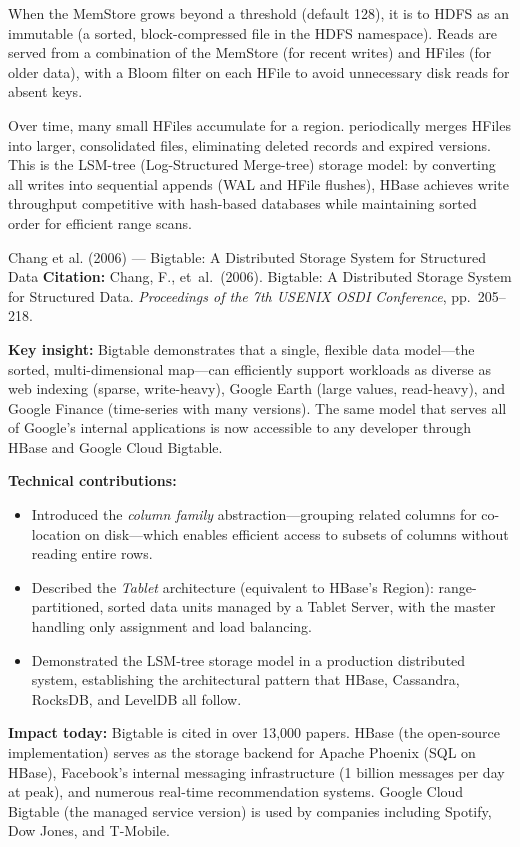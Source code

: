 When the MemStore grows beyond a threshold (default 128\MB), it is
 to HDFS as an immutable  (a sorted,
block-compressed file in the HDFS namespace). Reads are served from
a combination of the MemStore (for recent writes) and HFiles (for
older data), with a Bloom filter on each HFile to avoid unnecessary
disk reads for absent keys.

Over time, many small HFiles accumulate for a region. 
periodically merges HFiles into larger, consolidated files, eliminating
deleted records and expired versions. This is the LSM-tree (Log-Structured
Merge-tree) storage model: by converting all writes into sequential
appends (WAL and HFile flushes), HBase achieves write throughput
competitive with hash-based databases while maintaining sorted order
for efficient range scans.

\begin{researchspotlight}{Chang et al. (2006) --- Bigtable: A Distributed Storage System for Structured Data}
\textbf{Citation:} Chang, F., et~al.\ (2006). Bigtable: A Distributed
Storage System for Structured Data. \textit{Proceedings of the 7th
USENIX OSDI Conference}, pp.\ 205--218. \parencite{Bigtable2006}

\smallskip\noindent
\textbf{Key insight:} Bigtable demonstrates that a single, flexible
data model---the sorted, multi-dimensional map---can efficiently
support workloads as diverse as web indexing (sparse, write-heavy),
Google Earth (large values, read-heavy), and Google Finance
(time-series with many versions). The same model that serves all
of Google's internal applications is now accessible to any developer
through HBase and Google Cloud Bigtable.

\smallskip\noindent
\textbf{Technical contributions:}
\begin{itemize}
  \item Introduced the \emph{column family} abstraction---grouping
        related columns for co-location on disk---which enables
        efficient access to subsets of columns without reading
        entire rows.
  \item Described the \emph{Tablet} architecture (equivalent to
        HBase's Region): range-partitioned, sorted data units
        managed by a Tablet Server, with the master handling
        only assignment and load balancing.
  \item Demonstrated the LSM-tree storage model in a production
        distributed system, establishing the architectural pattern
        that HBase, Cassandra, RocksDB, and LevelDB all follow.
\end{itemize}

\smallskip\noindent
\textbf{Impact today:} Bigtable is cited in over 13,000 papers.
HBase (the open-source implementation) serves as the storage backend
for Apache Phoenix (SQL on HBase), Facebook's internal messaging
infrastructure (1 billion messages per day at peak), and numerous
real-time recommendation systems. Google Cloud Bigtable (the managed
service version) is used by companies including Spotify, Dow Jones,
and T-Mobile.
\end{researchspotlight}

